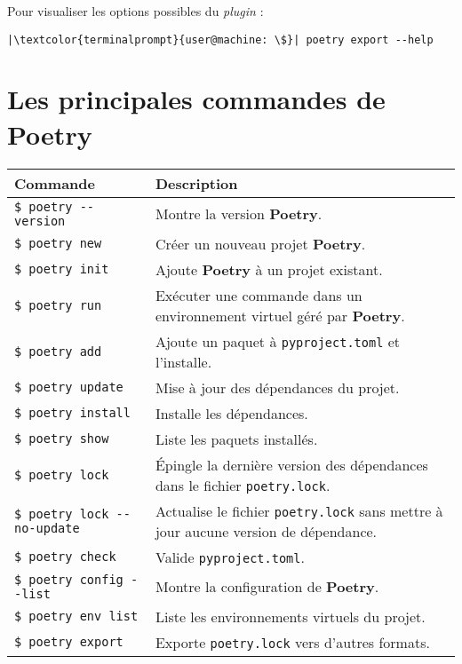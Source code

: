 Pour visualiser les options possibles du \textit{plugin} :
\begin{lstlisting}[style=terminal]
|\textcolor{terminalprompt}{user@machine: \$}| poetry export --help
\end{lstlisting}

\section{Les principales commandes de \textbf{Poetry}}

\begin{center}
\begin{table}[h!]
\begin{tabularx}{\textwidth}{|l|X|}
\hline
\textbf{Commande} & \textbf{Description} \\ \hline
\verb|$ poetry --version| & Montre la version \textbf{Poetry}. \\ \hline
\verb|$ poetry new| & Créer un nouveau projet \textbf{Poetry}. \\ \hline
\verb|$ poetry init| & Ajoute \textbf{Poetry} à un projet existant. \\ \hline
\verb|$ poetry run| & Exécuter une commande dans un environnement virtuel géré par \textbf{Poetry}. \\ \hline
\verb|$ poetry add| & Ajoute un paquet à \verb|pyproject.toml| et l'installe. \\ \hline
\verb|$ poetry update| & Mise à jour des dépendances du projet. \\ \hline
\verb|$ poetry install| & Installe les dépendances. \\ \hline
\verb|$ poetry show| & Liste les paquets installés. \\ \hline
\verb|$ poetry lock| & Épingle la dernière version des dépendances dans le fichier \verb|poetry.lock|. \\ \hline
\verb|$ poetry lock --no-update| & Actualise le fichier \verb|poetry.lock| sans mettre à jour aucune version de dépendance. \\ \hline
\verb|$ poetry check| & Valide \verb|pyproject.toml|. \\ \hline
\verb|$ poetry config --list| & Montre la configuration de \textbf{Poetry}. \\ \hline
\verb|$ poetry env list| & Liste les environnements virtuels du projet. \\ \hline
\verb|$ poetry export| & Exporte \verb|poetry.lock| vers d'autres formats. \\ \hline
\end{tabularx}
\end{table}
\end{center}

